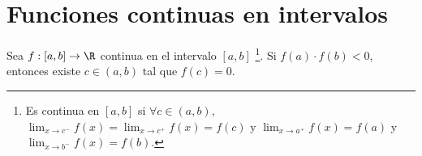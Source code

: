 \section{Funciones continuas en intervalos}
\begin{ftheorem}
	\normalfont Sea $\displaystyle f : [a,b] \to \R $ continua en el intervalo $\displaystyle [a,b] $ \footnote{Es continua en $\displaystyle [a,b] $ si $\displaystyle \forall c \in \left(a,b\right) $, $\displaystyle \lim_{x \to c^{-}}f\left(x\right) = \lim_{x \to c^{+}}f\left(x\right) = f\left(c\right) $ y $\displaystyle \lim_{x \to a^{+}}f\left(x\right) = f\left(a\right) $ y $\displaystyle \lim_{x \to b^{-}}f\left(x\right) = f\left(b\right) $.}. Si $\displaystyle f\left(a\right) \cdot f\left(b\right) < 0 $, entonces existe $\displaystyle c \in \left(a,b\right) $ tal que $\displaystyle f\left(c\right) = 0 $.
\end{ftheorem}

